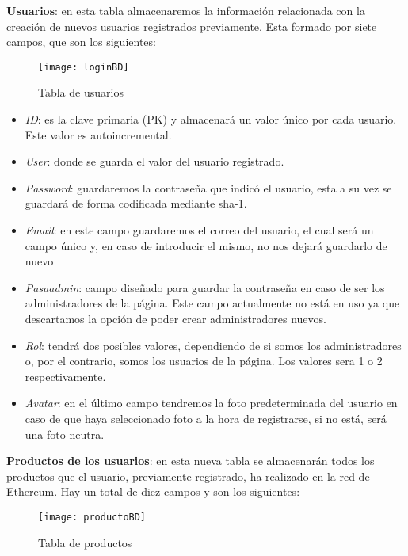 \textbf{Usuarios}: en esta tabla almacenaremos la información relacionada con la creación de nuevos usuarios registrados previamente. Esta formado por siete campos, que son los siguientes:
\begin{figure}[H]
    \centering
    \texttt{[image: loginBD]}
    \caption{Tabla de usuarios}
\end{figure}
\begin{itemize}
	\item \textit{ID}: es la clave primaria (PK) y almacenará un valor único por cada usuario. Este valor es autoincremental.
	\item \textit{User}: donde se guarda el valor del usuario registrado.
	\item \textit{Password}: guardaremos la contraseña que indicó el usuario, esta a su vez se guardará de forma codificada mediante sha-1.
	\item \textit{Email}: en este campo guardaremos el correo del usuario, el cual será un campo único y, en caso de introducir el mismo, no nos dejará guardarlo de nuevo
	\item \textit{Pasaadmin}: campo diseñado para guardar la contraseña en caso de ser los administradores de la página. Este campo actualmente no está en uso ya que descartamos la opción de poder crear administradores nuevos.  	
	\item \textit{Rol}: tendrá dos posibles valores, dependiendo de si somos los administradores o, por el contrario, somos los usuarios de la página. Los valores sera 1 o 2 respectivamente.
	\item \textit{Avatar}: en el último campo tendremos la foto predeterminada del usuario en caso de que haya seleccionado foto a la hora de registrarse, si no está, será una foto neutra.
\end{itemize}

\textbf{Productos de los usuarios}: en esta nueva tabla se almacenarán todos los productos que el usuario, previamente registrado, ha realizado en la red de Ethereum. Hay un total de diez campos y son los siguientes:
 
\begin{figure}[h]
    \centering
    \texttt{[image: productoBD]}
    \caption{Tabla de productos}
\end{figure}

